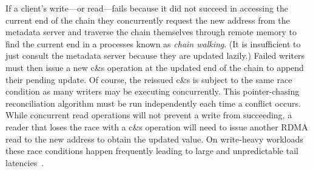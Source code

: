 If a client's write---or read---fails because it did not succeed in
accessing the current end of the chain they concurrently request the
new address from the metadata server and traverse the chain themselves
through remote memory to find the current end in a processes known as
\emph{chain walking}.  (It is insufficient to just consult the
metadata server because they are updated lazily.)  Failed writers must
then issue a new c\&s operation at the updated end of the chain to append
their pending update.  Of course, the reissued c\&s is subject to the
same race condition as many writers may be executing
concurrently. This pointer-chasing reconciliation algorithm must be
run independently each time a conflict occurs.
While concurrent read operations will not prevent a write from
succeeding, a reader that loses the race with a c\&s operation will
need to issue another RDMA read to the new address to obtain the
updated value.  On write-heavy workloads these race conditions happen
frequently
leading to large and unpredictable tail latencies~\cite{clover}.








